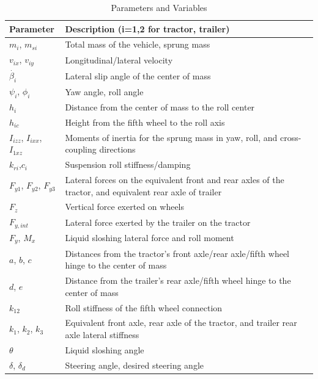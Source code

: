 \begin{table}[!htbp]
  \centering
  \caption{Parameters and Variables}
  \label{tab:parameters}
  \begin{tabularx}{0.45\textwidth}{@{}lX@{}}
    \toprule
    \textbf{Parameter} & \textbf{Description (i=1,2 for tractor, trailer)} \\
    \midrule
    $m_i$, $m_{si}$ & Total mass of the vehicle, sprung mass \\
    $v_{ix}$, $v_{iy}$ & Longitudinal/lateral velocity \\
    $\dot{\beta_i}$ & Lateral slip angle of the center of mass \\
    $\psi_i$, $\phi_i$ & Yaw angle, roll angle \\
    $h_i$ & Distance from the center of mass to the roll center \\
    $h_{ic}$ & Height from the fifth wheel to the roll axis \\
    $I_{izz}$, $I_{ixx}$, $I_{1xz}$ & Moments of inertia for the sprung mass in yaw, roll, and cross-coupling directions \\
    $k_{ri}$,$c_i$ & Suspension roll stiffness/damping \\
    $F_{y1}$, $F_{y2}$, $F_{y3}$ & Lateral forces on the equivalent front and rear axles of the tractor, and equivalent rear axle of trailer \\
    $F_z$ & Vertical force exerted on wheels\\
    $F_{y,int}$ & Lateral force exerted by the trailer on the tractor \\
    $F_y$, $M_x$ & Liquid sloshing lateral force and roll moment\\
    $a$, $b$, $c$& Distances from the tractor's front axle/rear axle/fifth wheel hinge to the center of mass \\
    $d$, $e$ & Distance from the trailer's rear axle/fifth wheel hinge to the center of mass \\
    $k_{12}$ & Roll stiffness of the fifth wheel connection\\
    $k_1$, $k_2$, $k_3$ & Equivalent front axle, rear axle of the tractor, and trailer rear axle lateral stiffness  \\
    $\theta$ & Liquid sloshing angle \\
    $\delta$, $\delta_d$ & Steering angle, desired steering angle \\
    \bottomrule
  \end{tabularx}
\end{table}

